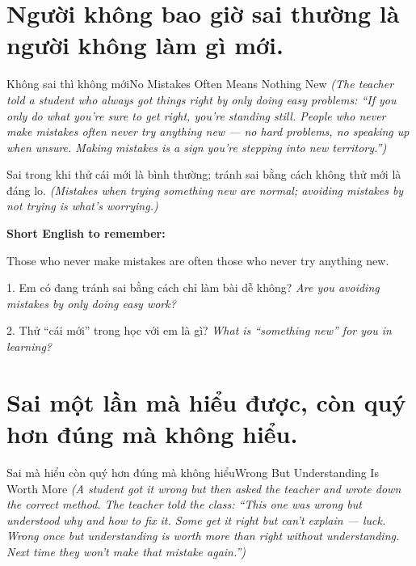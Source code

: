 \section{Người không bao giờ sai thường là người không làm gì mới.}
\begin{truyen}{Không sai thì không mới}{No Mistakes Often Means Nothing New}
\textit{(The teacher told a student who always got things right by only doing easy problems: ``If you only do what you're sure to get right, you're standing still. People who never make mistakes often never try anything new — no hard problems, no speaking up when unsure. Making mistakes is a sign you're stepping into new territory.'')}
\end{truyen}

\begin{baihoc}
Sai trong khi thử cái mới là bình thường; tránh sai bằng cách không thử mới là đáng lo.
\textit{(Mistakes when trying something new are normal; avoiding mistakes by not trying is what's worrying.)}
\end{baihoc}

\begin{ghinhoanh}
\textbf{Short English to remember:}

Those who never make mistakes are often those who never try anything new.

\end{ghinhoanh}

\begin{tuhocnhanh}
1. Em có đang tránh sai bằng cách chỉ làm bài dễ không? \textit{Are you avoiding mistakes by only doing easy work?}

2. Thử ``cái mới'' trong học với em là gì? \textit{What is ``something new'' for you in learning?}
\end{tuhocnhanh}
\ngancach

\section{Sai một lần mà hiểu được, còn quý hơn đúng mà không hiểu.}
\begin{truyen}{Sai mà hiểu còn quý hơn đúng mà không hiểu}{Wrong But Understanding Is Worth More}
\textit{(A student got it wrong but then asked the teacher and wrote down the correct method. The teacher told the class: ``This one was wrong but understood why and how to fix it. Some get it right but can't explain — luck. Wrong once but understanding is worth more than right without understanding. Next time they won't make that mistake again.'')}
\end{truyen}

